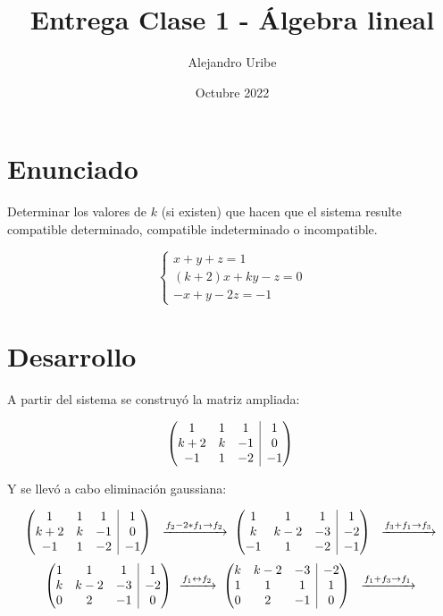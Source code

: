 \documentclass[a4paper,spanish]{article}
\title{Entrega Clase 1 - Álgebra lineal}
\author{Alejandro Uribe}
\date{Octubre 2022}
\begin{document}
\maketitle
\section*{Enunciado}
Determinar los valores de $k$ (si existen) que hacen que el sistema resulte compatible determinado, compatible indeterminado o incompatible.

\[
    \begin{cases}
        x + y + z = 1       \\
        (k+2)x + ky -z  = 0 \\
        -x +y -2z = -1
    \end{cases}
\]

\section*{Desarrollo}

A partir del sistema se construyó la matriz ampliada:

\[
    \begin{array}({@{}ccc|c@{}})
        1   & 1 & 1  & 1  \\
        k+2 & k & -1 & 0  \\
        -1  & 1 & -2 & -1
    \end{array}\
\]

Y se llevó a cabo eliminación gaussiana:

\[
    \begin{array}({@{}ccc|c@{}})
        1   & 1 & 1  & 1  \\
        k+2 & k & -1 & 0  \\
        -1  & 1 & -2 & -1
    \end{array}\
    \;
    \xrightarrow{f_2 - 2*f_1 \rightarrow f_2}
    \;
    \begin{array}({@{}ccc|c@{}})
        1  & 1   & 1  & 1  \\
        k  & k-2 & -3 & -2 \\
        -1 & 1   & -2 & -1
    \end{array}\
    \;
    \xrightarrow{f_3 + f_1 \rightarrow f_3}
    \;
\]
\[
    \begin{array}({@{}ccc|c@{}})
        1 & 1   & 1  & 1  \\
        k & k-2 & -3 & -2 \\
        0 & 2   & -1 & 0
    \end{array}\
    \xrightarrow{f_1 \leftrightarrow f_2}
    \;
    \begin{array}({@{}ccc|c@{}})
        k & k-2 & -3 & -2 \\
        1 & 1   & 1  & 1  \\
        0 & 2   & -1 & 0
    \end{array}\
    \;
    \xrightarrow{f_1 + f_3 \rightarrow f_1}
    \;
\]
\end{document}
